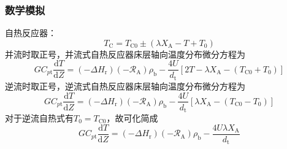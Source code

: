 \begin{frame}
    \frametitle{数学模拟}

    自热反应器：
    \[
        T_{\mathrm{C}}=T_{\mathrm{C} 0} \pm (\lambda X_{\mathrm{A}}-T+T_{0})
    \]
    并流时取正号，并流式自热反应器床层轴向温度分布微分方程为
    \[
        G C_{p \mathrm{t} } \frac{\mathrm{d} T}{\mathrm{d} Z}=(-\Delta H_{\mathrm{r}})(-\mathscr{R}_{\mathrm{A}}) \rho_{\mathrm{b}}-\frac{4 U}{d_{\mathrm{t}}}\left[2 T-\lambda X_{\mathrm{A}}-(T_{\mathrm{C} 0}+T_{0})\right]
    \]
    逆流时取正号，逆流式自热反应器床层轴向温度分布微分方程为
    \[
        G C_{p \mathrm{t}} \frac{\mathrm{d} T}{\mathrm{d} Z}=(-\Delta H_{\mathrm{r}})(-\mathscr{R}_{\mathrm{A}}) \rho_{\mathrm{b}}-\frac{4 U}{d_{\mathrm{t}}}\left[\lambda X_{\mathrm{A}}-(T_{\mathrm{C} 0}-T_{0})\right]
    \]
    对于逆流自热式有$T_{0} = T_{\mathrm{C} 0}$，故可化简成
    \[
        G C_{p \mathrm{t}} \frac{\mathrm{d} T}{\mathrm{d} Z}= (-\Delta H_{\mathrm{r}})(-\mathscr{R}_{\mathrm{A}}) \rho_{\mathrm{b}}-\frac{4 U \lambda X_{\mathrm{A}}}{d_{\mathrm{t}}}
    \]

\end{frame}